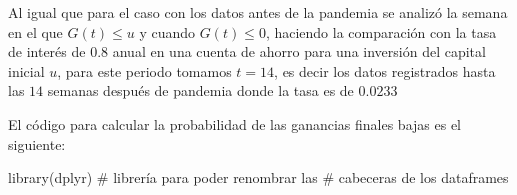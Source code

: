 \documentclass[
  us-letterpaper,
]{scrreprt}
\newenvironment{Shaded}{\begin{snugshade}}{\end{snugshade}}
\newcommand{\CommentTok}[1]{\textcolor[rgb]{0.37,0.37,0.37}{#1}}
\newcommand{\FunctionTok}[1]{\textcolor[rgb]{0.28,0.35,0.67}{#1}}
\newcommand{\NormalTok}[1]{\textcolor[rgb]{0.00,0.23,0.31}{#1}}
\theoremstyle{definition}
\theoremstyle{plain}
\theoremstyle{plain}
\theoremstyle{remark}
\begin{document}
Al igual que para el caso con los datos antes de la pandemia se analizó
la semana en el que \(G(t)\leq u\) y cuando \(G(t)\leq0\), haciendo la
comparación con la tasa de interés de \(0.8\) anual en una cuenta de
ahorro para una inversión del capital inicial \(u\), para este periodo
tomamos \(t = 14\), es decir los datos registrados hasta las \(14\)
semanas después de pandemia donde la tasa es de \(0.0233\)

El código para calcular la probabilidad de las ganancias finales bajas
es el siguiente:

\begin{Shaded}
\begin{Highlighting}[]
\FunctionTok{library}\NormalTok{(dplyr) }\CommentTok{\# librería para poder renombrar las }
\CommentTok{\# cabeceras de los dataframes}


\end{Highlighting}
\end{Shaded}
\end{document}
